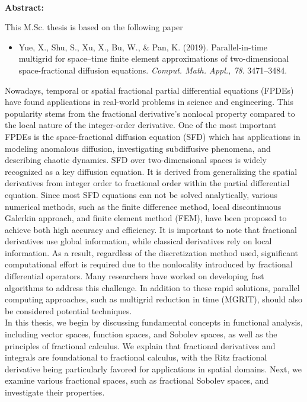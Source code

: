 \noindent
\hrulefill
\\
\textbf{Abstract:}
\\
{
\small 
This M.Sc. thesis is based on the following paper
\begin{itemize}\addtolength{\itemsep}{-0.4\baselineskip}
\item
Yue, X., Shu, S., Xu, X., Bu, W., \& Pan, K.
(2019).
Parallel-in-time multigrid for space–time finite element approximations of two-dimensional space-fractional diffusion equations.
\textit{Comput. Math. Appl., 78}.
3471–3484.
\end{itemize}
Nowadays, temporal or spatial fractional partial differential equations (FPDEs) have found applications in real-world problems in science and engineering. 
This popularity stems from the fractional derivative's nonlocal property compared to the local nature of the integer-order derivative. 
One of the most important FPDEs is the space-fractional diffusion equation (SFD) which has applications in modeling anomalous diffusion, investigating subdiffusive phenomena, and describing chaotic dynamics.
SFD over two-dimensional spaces is widely recognized as a key diffusion equation. 
It is derived from generalizing the spatial derivatives from integer order to fractional order within the partial differential equation. 
Since most SFD equations can not be solved analytically, various numerical methods, such as the finite difference method, local discontinuous Galerkin approach, and finite element method (FEM), have been proposed to achieve both high accuracy and efficiency.
It is important to note that fractional derivatives use global information, while classical derivatives rely on local information. 
As a result, regardless of the discretization method used, significant computational effort is required due to the nonlocality introduced by fractional differential operators. 
Many researchers have worked on developing fast algorithms to address this challenge. 
In addition to these rapid solutions, parallel computing approaches, such as multigrid reduction in time (MGRIT), should also be considered potential techniques. 
\\
In this thesis, we begin by discussing fundamental concepts in functional analysis, including vector spaces, function spaces, and Sobolev spaces, as well as the principles of fractional calculus. 
We explain that fractional derivatives and integrals are foundational to fractional calculus, with the Ritz fractional derivative being particularly favored for applications in spatial domains. 
Next, we examine various fractional spaces, such as fractional Sobolev spaces, and investigate their properties.
}
